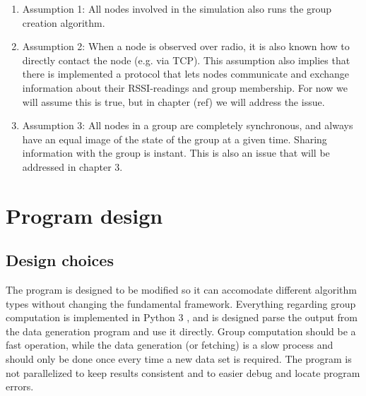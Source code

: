     \begin{enumerate}
    \item Assumption 1: All nodes involved in the simulation also runs the group creation algorithm. 
		\item Assumption 2: When a node is observed over radio, it is also known how to directly contact the node (e.g. via TCP). This assumption also implies that there is implemented a protocol that lets nodes communicate and exchange information about their RSSI-readings and group membership. For now we will assume this is true, but in chapter {{(ref)}} we will address the issue. 
		\item Assumption 3: All nodes in a group are completely synchronous, and always have an equal image of the state of the group at a given time. Sharing information with the group is instant. This is also an issue that will be addressed in chapter {{3}}.
    \end{enumerate}
\section{Program design}
\subsection{Design choices}
The program is designed to be modified so it can accomodate different algorithm types without changing the fundamental framework.
Everything regarding group computation is implemented in Python 3 \cite{Python3}, and is designed parse the output from the data generation program and use it directly.
Group computation should be a fast operation, while the data generation (or fetching) is a slow process and should only be done once every time a new data set is required.
The program is not parallelized to keep results consistent and to easier debug and locate program errors. 

